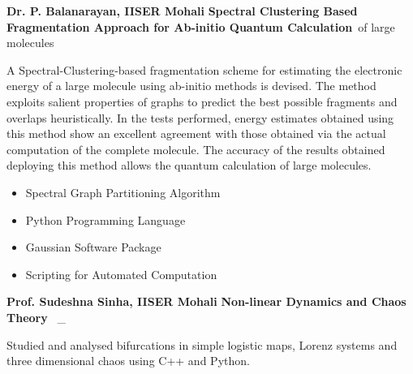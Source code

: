 {%
\textbf{Dr. P. Balanarayan, IISER Mohali}	}
	{%
		\textbf{Spectral Clustering Based Fragmentation Approach for Ab-initio Quantum Calculation}~of large molecules}
		{%
		A Spectral-Clustering-based fragmentation scheme for estimating the electronic energy of a large molecule using ab­-initio methods is devised. The method exploits salient properties of graphs to predict the best possible fragments and overlaps heuristically. In the tests performed, energy estimates obtained using this method show an excellent agreement with those obtained via the actual computation of the complete molecule. The accuracy of the results obtained deploying this method allows the quantum calculation of large molecules.
		\begin{multicols}{2}\raggedright %
			\begin{itemize}
				\item[\circ] Spectral Graph Partitioning Algorithm
				\item[\circ] Python Programming Language
				\end{itemize}
			\columnbreak
			
			\begin{itemize}
			\item[\circ] Gaussian Software Package
			\item[\circ] Scripting for Automated Computation
			\end{itemize}
			\columnbreak
			
		\end{multicols}
		}


{%
\textbf{Prof. Sudeshna Sinha, IISER Mohali	}}
	{%
		\textbf{Non-linear Dynamics and Chaos Theory }~_}
		{%
		Studied and analysed bifurcations in simple logistic maps, Lorenz systems and three dimensional chaos using
		C++ and Python.
			
			
		}